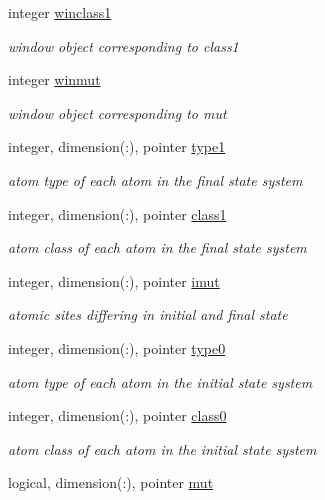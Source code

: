 \begin{DoxyCompactItemize}
integer \hyperlink{classmutant_af2055950a249a214a70d10531d910860}{winclass1}
\begin{DoxyCompactList}\small\item\em window object corresponding to class1 \end{DoxyCompactList}\item 
integer \hyperlink{classmutant_ae48640c836c4fc4f4c88cece6491e98c}{winmut}
\begin{DoxyCompactList}\small\item\em window object corresponding to mut \end{DoxyCompactList}\item 
integer, dimension(\-:), pointer \hyperlink{classmutant_a32601bca144d0e52789fc6ea96a7767a}{type1}
\begin{DoxyCompactList}\small\item\em atom type of each atom in the final state system \end{DoxyCompactList}\item 
integer, dimension(\-:), pointer \hyperlink{classmutant_ac7c18bbd9d33ced2a6f0aee1097b927f}{class1}
\begin{DoxyCompactList}\small\item\em atom class of each atom in the final state system \end{DoxyCompactList}\item 
integer, dimension(\-:), pointer \hyperlink{classmutant_a4757b139279f9001d6119ef90302f77e}{imut}
\begin{DoxyCompactList}\small\item\em atomic sites differing in initial and final state \end{DoxyCompactList}\item 
integer, dimension(\-:), pointer \hyperlink{classmutant_a6fc403c4284262ec13d260154dc672be}{type0}
\begin{DoxyCompactList}\small\item\em atom type of each atom in the initial state system \end{DoxyCompactList}\item 
integer, dimension(\-:), pointer \hyperlink{classmutant_a1d5964a9c3f4e954ed53b36f8fc119cd}{class0}
\begin{DoxyCompactList}\small\item\em atom class of each atom in the initial state system \end{DoxyCompactList}\item 
logical, dimension(\-:), pointer \hyperlink{classmutant_ae0c38ddd61deb335a7d9e16315c7e4c7}{mut}

\end{DoxyCompactItemize}
